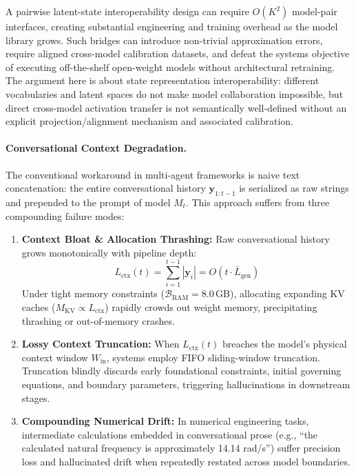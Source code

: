 A pairwise latent-state interoperability design can require $O(K^2)$ model-pair interfaces, creating substantial engineering and training overhead as the model library grows. Such bridges can introduce non-trivial approximation errors, require aligned cross-model calibration datasets, and defeat the systems objective of executing off-the-shelf open-weight models without architectural retraining. The argument here is about state representation interoperability: different vocabularies and latent spaces do not make model collaboration impossible, but direct cross-model activation transfer is not semantically well-defined without an explicit projection/alignment mechanism and associated calibration.

\paragraph{Conversational Context Degradation.}
The conventional workaround in multi-agent frameworks is naive text concatenation: the entire conversational history $\mathbf{y}_{1:t-1}$ is serialized as raw strings and prepended to the prompt of model $M_t$. This approach suffers from three compounding failure modes:
\begin{enumerate}
    \item \textbf{Context Bloat \& Allocation Thrashing:} Raw conversational history grows monotonically with pipeline depth:
    \begin{equation}
    L_{\text{ctx}}(t) = \sum_{i=1}^{t-1} |\mathbf{y}_i| = O(t \cdot \bar{L}_{\text{gen}})
    \end{equation}
    Under tight memory constraints ($\mathcal{B}_{\text{RAM}} = 8.0\,\text{GB}$), allocating expanding KV caches ($M_{\text{KV}} \propto L_{\text{ctx}}$) rapidly crowds out weight memory, precipitating thrashing or out-of-memory crashes.
    \item \textbf{Lossy Context Truncation:} When $L_{\text{ctx}}(t)$ breaches the model's physical context window $W_{\text{in}}$, systems employ FIFO sliding-window truncation. Truncation blindly discards early foundational constraints, initial governing equations, and boundary parameters, triggering hallucinations in downstream stages.
    \item \textbf{Compounding Numerical Drift:} In numerical engineering tasks, intermediate calculations embedded in conversational prose (e.g., ``the calculated natural frequency is approximately 14.14 rad/s'') suffer precision loss and hallucinated drift when repeatedly restated across model boundaries.
\end{enumerate}

